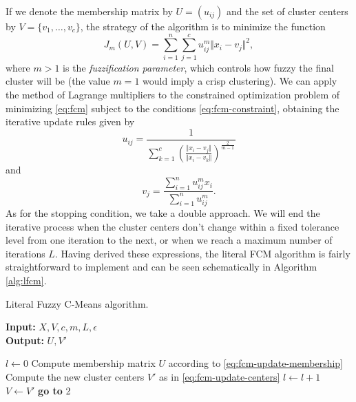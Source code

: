 If we denote the membership matrix by $U=(u_{ij})$ and the set of cluster centers by $V=\{v_1,\dots, v_c\}$, the strategy of the algorithm is to minimize the function
\begin{equation} \label{eq:fcm}
J_m(U,V) = \sum_{i=1}^n \sum_{j=1}^c u_{ij}^m \Vert x_i - v_j \Vert ^2,
\end{equation}
where $m > 1$ is the \textit{fuzzification parameter}, which controls how fuzzy the final cluster will be (the value $m=1$ would imply a crisp clustering). We can apply the method of Lagrange multipliers to the constrained optimization problem of minimizing \eqref{eq:fcm} subject to the conditions \eqref{eq:fcm-constraint}, obtaining the iterative update rules given by
\begin{equation} \label{eq:fcm-update-membership}
  u_{ij}= \dfrac{1}{\displaystyle \sum_{k=1}^c \left( \frac{\Vert x_i - v_j \Vert}{\Vert x_i - v_k \Vert} \right)^{\frac{2}{m-1}}}
\end{equation}
and
\begin{equation} \label{eq:fcm-update-centers}
v_j = \dfrac{\displaystyle\sum_{i=1}^n u_{ij}^m x_i}{\displaystyle\sum_{i=1}^n u_{ij}^m}.
\end{equation}
As for the stopping condition, we take a double approach. We will end the iterative process when the cluster centers don't change within a fixed tolerance level from one iteration to the next, or when we reach a maximum number of iterations $L$. Having derived these expressions, the literal FCM algorithm is fairly straightforward to implement and can be seen schematically in Algorithm \ref{alg:lfcm}.

\begin{algorithm}
  \caption{Literal Fuzzy C-Means algorithm.}
    \label{alg:lfcm}
    \textbf{Input:} $X,V,c,m,L, \epsilon$\\
    \textbf{Output:} $U,V'$
  \begin{algorithmic}[1]
    \State $l \gets 0$
    \State Compute membership matrix $U$ according to \eqref{eq:fcm-update-membership}
    \State Compute the new cluster centers $V'$ as in \eqref{eq:fcm-update-centers}
    \State $l \gets l+1$
     
      \State {}
    \Else
      \State $V \gets V'$
      \State \textbf{go to} 2
    \EndIf
  \end{algorithmic}
\end{algorithm}

